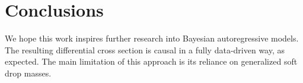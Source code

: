 \section{Conclusions}\label{sec:conclusions}

We hope this work inspires further research into Bayesian autoregressive
models. The resulting differential cross section is causal in a fully
data-driven way, as expected. The main limitation of this approach is
its reliance on generalized soft drop masses.


